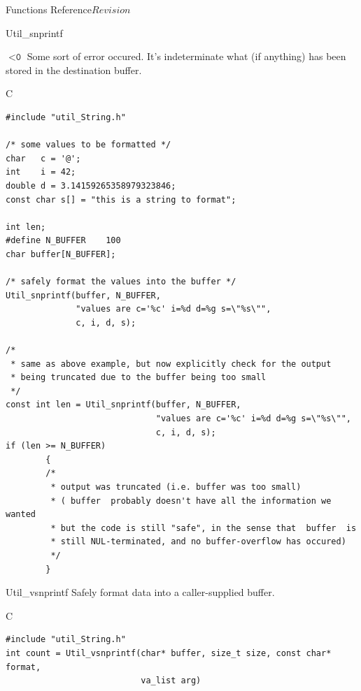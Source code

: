 \begin{cactuspart}{ Functions Reference}{}{$Revision$}
\begin{FunctionDescription}{Util\_snprintf}
\begin{ErrorSection}
\begin{Error}{$< \texttt{0}$}
Some sort of error occured.  It's indeterminate what (if anything)
has been stored in the destination buffer.
\end{Error}
\end{ErrorSection}

\begin{ExampleSection}
\begin{Example}{C}
\begin{verbatim}
#include "util_String.h"

/* some values to be formatted */
char   c = '@';
int    i = 42;
double d = 3.14159265358979323846;
const char s[] = "this is a string to format";

int len;
#define N_BUFFER	100
char buffer[N_BUFFER];

/* safely format the values into the buffer */
Util_snprintf(buffer, N_BUFFER,
              "values are c='%c' i=%d d=%g s=\"%s\"",
              c, i, d, s);

/*
 * same as above example, but now explicitly check for the output
 * being truncated due to the buffer being too small
 */
const int len = Util_snprintf(buffer, N_BUFFER,
                              "values are c='%c' i=%d d=%g s=\"%s\"",
                              c, i, d, s);
if (len >= N_BUFFER)
        {
        /*
         * output was truncated (i.e. buffer was too small)
         * ( buffer  probably doesn't have all the information we wanted
         * but the code is still "safe", in the sense that  buffer  is
         * still NUL-terminated, and no buffer-overflow has occured)
         */
        }
\end{verbatim}
\end{Example}
\end{ExampleSection}
\end{FunctionDescription}

\begin{FunctionDescription}{Util\_vsnprintf}
\label{Util-vsnprintf}
Safely format data into a caller-supplied buffer.

\begin{SynopsisSection}
\begin{Synopsis}{C}
\begin{verbatim}
#include "util_String.h"
int count = Util_vsnprintf(char* buffer, size_t size, const char* format,
                           va_list arg)
\end{verbatim}
\end{Synopsis}
\end{SynopsisSection}


\end{FunctionDescription}
\end{cactuspart}
